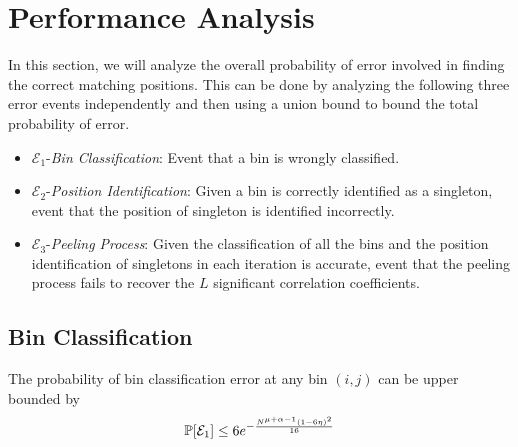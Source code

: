 \section{Performance Analysis}
\label{sec:analysis}
\def\vgap{2pt}
In this section, we will analyze the overall probability of error involved in finding the correct matching positions. This can be done by analyzing the following three error events independently and then using a union bound to bound the total probability of error.

\begin{itemize}
	\item $\mathcal{E}_1${-\it Bin Classification}: Event that a bin is wrongly classified.
	\item $\mathcal{E}_2${-\it Position Identification}: Given a bin is correctly identified as a singleton, event that the position of singleton is identified incorrectly.
	\item $\mathcal{E}_3${-\it Peeling Process}: Given the classification of all the bins and the position identification of singletons in each iteration is accurate, event that the peeling process fails to recover the $L$ significant correlation coefficients.
\end{itemize}

\subsection{\bf Bin Classification}
\begin{lemma}
The probability of bin classification error at any bin $(i,j)$ can be upper bounded by
\begin{align*}
\mathbb{P}[\mathcal{E}_1]\leq 6e^{-\frac{N^{\mu+\alpha-1}(1-6\eta)^2}{16}}
\end{align*} \label{Lem:binclassification}
\end{lemma}

